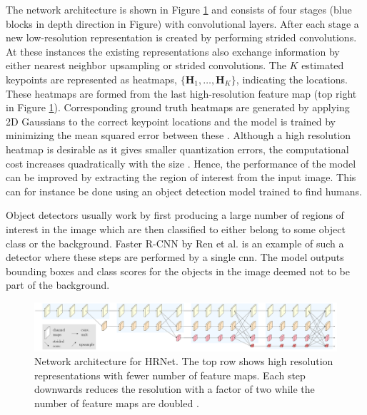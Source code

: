 The network architecture is shown in Figure \ref{fig:hrnet} and consists of four stages (blue blocks in depth direction in Figure) with convolutional layers. After each stage a new low-resolution representation is created by performing strided convolutions. At these instances the existing representations also exchange information by either nearest neighbor upsampling or strided convolutions. The $K$ estimated keypoints are represented as heatmaps, $\{\mathbf{H}_1, \hdots, \mathbf{H}_K\}$, indicating the locations. These heatmaps are formed from the last high-resolution feature map (top right in Figure \ref{fig:hrnet}). Corresponding ground truth heatmaps are generated by applying 2D Gaussians to the correct keypoint locations and the model is trained by minimizing the mean squared error between these \cite{Sun2019}. Although a high resolution heatmap is desirable as it gives smaller quantization errors, the computational cost increases quadratically with the size \cite{Zhang2020}. Hence, the performance of the model can be improved by extracting the region of interest from the input image. This can for instance be done using an object detection model trained to find humans.

Object detectors usually work by first producing a large number of regions of interest in the image which are then classified to either belong to some object class or the background. Faster R-CNN by Ren et al. \cite{Ren2017} is an example of such a detector where these steps are performed by a single \gls{cnn}. The model outputs bounding boxes and class scores for the objects in the image deemed not to be part of the background. %


\begin{figure}
 \centering
 \includegraphics[width=\textwidth]{files/figs/hrnet.png}
 \caption{Network architecture for HRNet. The top row shows high resolution representations with fewer number of feature maps. Each step downwards reduces the resolution with a factor of two while the number of feature maps are doubled \cite{Wang2020}.}
 \label{fig:hrnet}
\end{figure}


